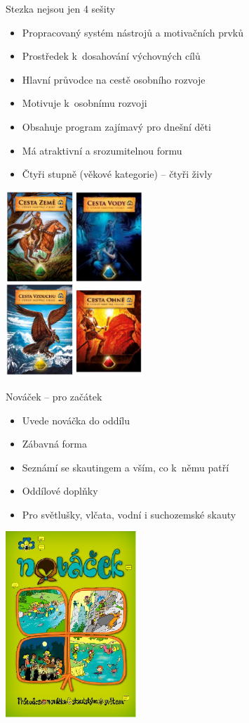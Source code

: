 \documentclass[compress,utf8,xcolor=dvipsnames]{beamer}
\begin{document}
\begin{frame}{Stezka nejsou jen 4 sešity}
\begin{multicols}{2}
\begin{itemize}
\item Propracovaný systém nástrojů a motivačních prvků
\item Prostředek k dosahování výchovných cílů
\item Hlavní průvodce na cestě osobního rozvoje
\item Motivuje k osobnímu rozvoji
\item Obsahuje program zajímavý pro dnešní děti
\item Má atraktivní a srozumitelnou formu
\item Čtyři stupně (věkové kategorie) -- čtyři živly
\end{itemize}
\columnbreak
\includegraphics[height=7cm]{stezky.png}
\end{multicols}
\end{frame}

\begin{frame}{Nováček -- pro začátek}
\begin{multicols}{2}
\begin{itemize}
\item Uvede nováčka do oddílu
\item Zábavná forma
\item Seznámí se skautingem a vším, co k~němu patří
\item Oddílové doplňky
\item Pro světlušky, vlčata, vodní i suchozemské skauty
\end{itemize}
\columnbreak
\includegraphics[height=7cm]{novacek.png}
\end{multicols}
\end{frame}
\end{document}
